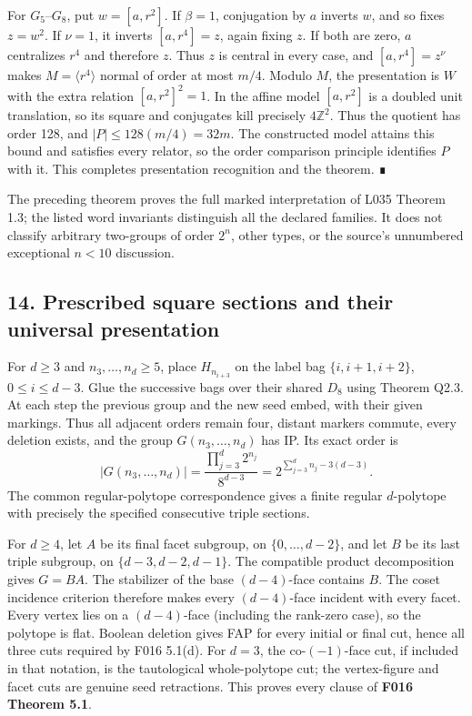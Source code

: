 \documentclass[
  10pt,
  letterpaper,
]{article}
\begin{document}
For \(G_5\)--\(G_8\), put \(w=[a,r^2]\). If \(\beta=1\), conjugation by
\(a\) inverts \(w\), and so fixes \(z=w^2\). If \(\nu=1\), it inverts
\([a,r^4]=z\), again fixing \(z\). If both are zero, \(a\) centralizes
\(r^4\) and therefore \(z\). Thus \(z\) is central in every case, and
\([a,r^4]=z^\nu\) makes \(M=\langle r^4\rangle\) normal of order at most
\(m/4\). Modulo \(M\), the presentation is \(W\) with the extra relation
\([a,r^2]^2=1\). In the affine model \([a,r^2]\) is a doubled unit
translation, so its square and conjugates kill precisely
\(4\mathbb Z^2\). Thus the quotient has order 128, and
\(|P|\le128(m/4)=32m\). The constructed model attains this bound and
satisfies every relator, so the order comparison principle identifies
\(P\) with it. This completes presentation recognition and the theorem.
∎

The preceding theorem proves the full marked interpretation of L035
Theorem 1.3; the listed word invariants distinguish all the declared
families. It does not classify arbitrary two-groups of order \(2^n\),
other types, or the source's unnumbered exceptional \(n<10\) discussion.

\subsection{14. Prescribed square sections and their universal
presentation}\label{prescribed-square-sections-and-their-universal-presentation}

For \(d\ge3\) and \(n_3,\ldots,n_d\ge5\), place \(H_{n_{i+3}}\) on the
label bag \(\{i,i+1,i+2\}\), \(0\le i\le d-3\). Glue the successive bags
over their shared \(D_8\) using Theorem Q2.3. At each step the previous
group and the new seed embed, with their given markings. Thus all
adjacent orders remain four, distant markers commute, every deletion
exists, and the group \(G(n_3,\ldots,n_d)\) has IP. Its exact order is
\[
 |G(n_3,\ldots,n_d)|
 =\frac{\prod_{j=3}^d2^{n_j}}{8^{d-3}}
 =2^{\sum_{j=3}^d n_j-3(d-3)}.                           \tag{Q8.1}
\] The common regular-polytope correspondence gives a finite regular
\(d\)-polytope with precisely the specified consecutive triple sections.

For \(d\ge4\), let \(A\) be its final facet subgroup, on
\(\{0,\ldots,d-2\}\), and let \(B\) be its last triple subgroup, on
\(\{d-3,d-2,d-1\}\). The compatible product decomposition gives
\(G=BA\). The stabilizer of the base \((d-4)\)-face contains \(B\). The
coset incidence criterion therefore makes every \((d-4)\)-face incident
with every facet. Every vertex lies on a \((d-4)\)-face (including the
rank-zero case), so the polytope is flat. Boolean deletion gives FAP for
every initial or final cut, hence all three cuts required by F016
5.1(d). For \(d=3\), the co-\((-1)\)-face cut, if included in that
notation, is the tautological whole-polytope cut; the vertex-figure and
facet cuts are genuine seed retractions. This proves every clause of
\textbf{F016 Theorem 5.1}.
\end{document}
